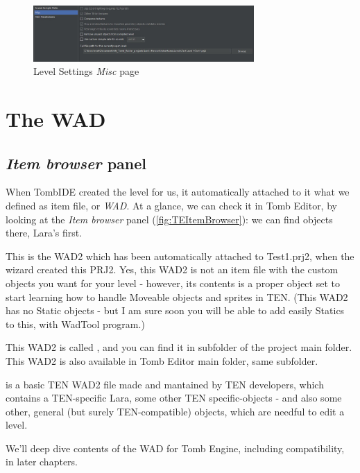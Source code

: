  \begin{figure}
    \centering
     \includegraphics[width=0.75\textwidth]{screenshots/24.jpg}
     \caption{Level Settings \emph{Misc} page}
     \label{fig:TElevelsettingsMisc}
\end{figure}

\chapter{The WAD}

\section {\emph{Item browser} panel}

When TombIDE created the level for us, it automatically attached to it what we defined as item file, or \emph{WAD}. At a glance, we can check it in Tomb Editor, by looking at the \emph{Item browser} panel (\ref{fig:TEItemBrowser}): we can find objects there, Lara's first.
\par This is the WAD2 which has been automatically attached to Test1.prj2, when the wizard created this PRJ2. Yes, this WAD2 is not an item file with the custom objects you want for your level - however, its contents is a proper object set to start learning how to handle Moveable objects and sprites in TEN. (This WAD2 has no Static objects - but I am sure soon you will be able to add easily Statics to this, with WadTool program.)
\par This WAD2 is called , and you can find it in  subfolder of the project main folder. This WAD2 is also available in Tomb Editor main folder, same subfolder.
\par {} is a basic TEN WAD2 file made and mantained by TEN developers, which contains a TEN-specific Lara, some other TEN specific-objects - and also some other, general (but surely TEN-compatible) objects, which are needful to edit a level.
\par We'll deep dive contents of the WAD for Tomb Engine, including compatibility, in later chapters.


